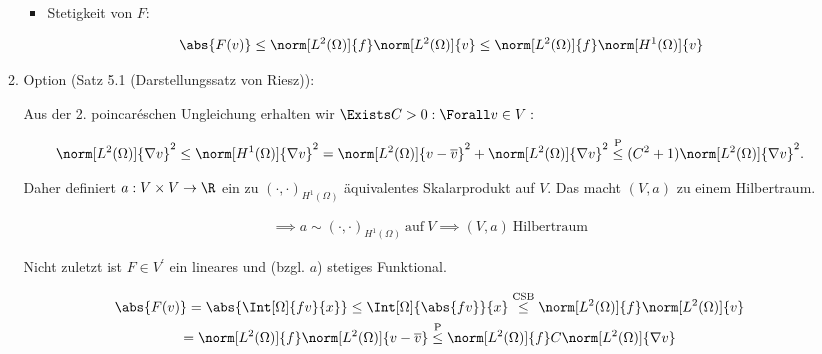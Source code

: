 \begin{solution}
\begin{enumerate}[label = \alph*)]
\begin{enumerate}[label = \arabic*.]
\begin{itemize}
            \item Stetigkeit von $F$:

            \begin{align*}
                \abs{F(v)}
                \leq
                \norm[L^2(\Omega)]{f} \norm[L^2(\Omega)]{v}
                \leq
                \norm[L^2(\Omega)]{f} \norm[H^1(\Omega)]{v}
            \end{align*}

        \end{itemize}

        \item Option (Satz 5.1 (Darstellungssatz von Riesz)):
        

        Aus der 2. poincaréschen Ungleichung erhalten wir $\Exists C > 0: \Forall v \in V:$

        \begin{align*}
            \norm[L^2(\Omega)]{\nabla v}^2
            \leq
            \norm[H^1(\Omega)]{\nabla v}^2
            =
            \norm[L^2(\Omega)]{v - \overline{v}}^2 + \norm[L^2(\Omega)]{\nabla v}^2
            \stackrel
            {
                \mathrm{P}
            }{\leq}
            (C^2 + 1) \norm[L^2(\Omega)]{\nabla v}^2.
        \end{align*}

        Daher definiert $a: V \times V \to \R$ ein zu $(\cdot, \cdot)_{H^1(\Omega)}$ äquivalentes Skalarprodukt auf $V$.
        Das macht $(V, a)$ zu einem Hilbertraum.

        \begin{align*}
            \implies
            a \sim (\cdot, \cdot)_{H^1(\Omega)} ~\text{auf}~ V
            \implies
            (V, a) ~\text{Hilbertraum}
        \end{align*}

        Nicht zuletzt ist $F \in V^\prime$ ein lineares und (bzgl. $a$) stetiges Funktional.

        \begin{multline*}
            \abs{F(v)}
            =
            \abs{\Int[\Omega]{f v}{x}}
            \leq
            \Int[\Omega]{\abs{f v}}{x}
            \stackrel
            {
                \mathrm{CSB}
            }{\leq}
            \norm[L^2(\Omega)]{f} \norm[L^2(\Omega)]{v} \\
            =
            \norm[L^2(\Omega)]{f} \norm[L^2(\Omega)]{v - \overline{v}}
            \stackrel
            {
                \mathrm{P}
            }{\leq}
            \norm[L^2(\Omega)]{f} C \norm[L^2(\Omega)]{\nabla v}
        \end{multline*}


\end{enumerate}
\end{enumerate}
\end{solution}
